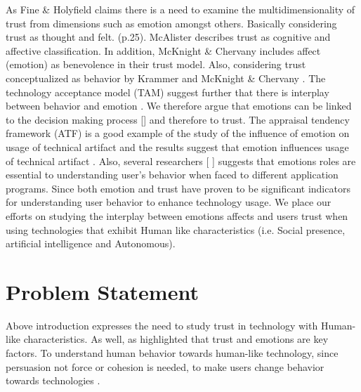 As Fine \& Holyfield \cite{fine1996secrecy:twelve} claims there is a need to examine the multidimensionality of trust from dimensions such as emotion amongst others. Basically considering trust as thought and felt. \cite{fine1996secrecy:twelve} (p.25). McAlister \cite{mcallister1995affect:thirteen} describes trust as cognitive and affective classification. In addition, McKnight \& Chervany \cite{mcknight2001trust:fourteen} includes affect (emotion) as  benevolence in their trust model. Also, considering trust conceptualized as behavior by Krammer \cite{kramer1999trust:sixteen} and McKnight \& Chervany \cite{mcknight2001trust:fourteen}. The technology acceptance model (TAM) suggest further that there is interplay between behavior and emotion \cite{tislar2014emotions:seventeen}. We therefore argue that emotions can be linked to the decision making process [\cite{ekman2007emotions:eighteen}\cite{keltner2014sociocultural:twenty}\cite{keltner2010emotion:nineteen}\cite{norman2004emotional:fifteen}] and therefore to trust. 
The appraisal tendency framework (ATF) is a good example  of the study of the influence of emotion on usage of technical artifact and the results suggest that emotion influences usage of technical artifact \cite{beaudry2010other:twentyone}. Also, several researchers [\cite{cristescu2008emotions:twentytwo} \cite{mcgraa2010effects:twentyfive}] suggests that emotions roles are essential to understanding user’s behavior when faced to different application programs.
Since both emotion and trust have proven to be significant indicators for understanding user behavior to enhance technology usage.  We place our efforts on studying the interplay  between emotions affects and users trust when using technologies that exhibit Human like characteristics (i.e.  Social presence, artificial intelligence and Autonomous).
\section{Problem Statement}
Above introduction expresses the need to study trust in technology with Human-like characteristics. As well, as highlighted that trust and emotions are key factors. To understand human behavior towards human-like technology, since persuasion not force or cohesion is needed, to make users change behavior towards technologies \cite{fogg2002persuasive:twentythree}. 
	
